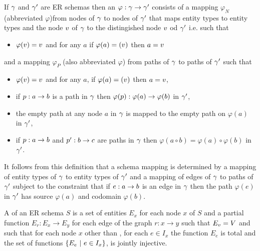 \begin{definition}
If $\gamma$ and  $\gamma'$ are ER schemas then an  
$\varphi : \gamma \rightarrow \gamma'$ consists of a mapping $\varphi_N$ (abbreviated $\varphi$)from nodes of
$\gamma$ to nodes of $\gamma'$ 
that maps entity types to entity types and the node $v$ of $\gamma$ to the distingished node
$v$ od $\gamma'$ i.e. such that
\begin{itemize}
\item $\varphi(v)=v$ and for any $a$ if $\varphi(a)=(v)$ then
$a = v$
\end{itemize}

and a mapping $\varphi_P$ (also abbreviated $\varphi$) from 
paths of $\gamma$ to paths of $\gamma'$ such that
\begin{itemize}
\item $\varphi(v)=v$ and for any $a$, if $\varphi(a)=(v)$ then
$a = v$,
\item  if $p:a \rightarrow b$ is a path in $\gamma$ then $\varphi(p):\varphi(a) \rightarrow \varphi(b)$ in $\gamma'$,
\item the empty path at any node $a$ in $\gamma$ is mapped to the empty path
on $\varphi(a)$ in $\gamma'$,
\item if $p: a \rightarrow b$ and $p': b \rightarrow c$ are paths in $\gamma$
then $\varphi(a \circ b) = \varphi(a) \circ \varphi(b)$ in $\gamma'$.
\end{itemize}
\end{definition}

It follows from this definition that a schema mapping is determined by 
a mapping of entity types of $\gamma$ to entity types of $\gamma'$ and a mapping of edges of $\gamma$ to paths of $\gamma'$ subject to the constraint
that if $e:a \rightarrow b$ is an edge in $\gamma$ then the path $\varphi(e)$ in $\gamma'$ has source $\varphi(a)$ and codomain $\varphi(b)$.
 
\begin{definition}
\noindent A   of an ER schema $S$ is
a set of entities $E_x$ for each node $x$ of $S$ and 
a partial function $E_r : E_x \rightarrow E_y$ for each edge of the graph $r:x \rightarrow y$ 
such that $E_v=V$
and such that 
for each node $x$ other than \veee, for each $e \in I_x$ the function $E_e$ is total and
the set of functions $\left\{E_e \ \middle|\ e \in I_x\right\}$, is jointly injective.
\end{definition}

